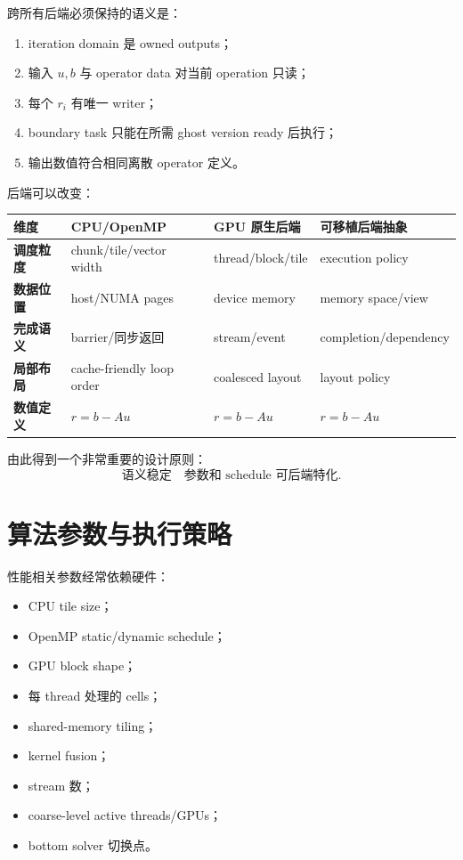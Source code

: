 跨所有后端必须保持的语义是：

\begin{enumerate}
\item iteration domain 是 owned outputs；
\item 输入 $u,b$ 与 operator data 对当前 operation 只读；
\item 每个 $r_i$ 有唯一 writer；
\item boundary task 只能在所需 ghost version ready 后执行；
\item 输出数值符合相同离散 operator 定义。
\end{enumerate}

后端可以改变：

\begin{center}
\begin{tabularx}{0.97\textwidth}{>{\bfseries}p{3.0cm}XXX}
\toprule
维度 & CPU/OpenMP & GPU 原生后端 & 可移植后端抽象\\
\midrule
调度粒度 & chunk/tile/vector width & thread/block/tile & execution policy\\
数据位置 & host/NUMA pages & device memory & memory space/view\\
完成语义 & barrier/同步返回 & stream/event & completion/dependency\\
局部布局 & cache-friendly loop order & coalesced layout & layout policy\\
数值定义 & $r=b-Au$ & $r=b-Au$ & $r=b-Au$\\
\bottomrule
\end{tabularx}
\end{center}

由此得到一个非常重要的设计原则：
\begin{equation}
\boxed{
\text{语义稳定}
\quad
\text{参数和 schedule 可后端特化}.
}
\label{eq:portability-semantics-policy}
\end{equation}

\section{算法参数与执行策略}

性能相关参数经常依赖硬件：

\begin{itemize}
\item CPU tile size；
\item OpenMP static/dynamic schedule；
\item GPU block shape；
\item 每 thread 处理的 cells；
\item shared-memory tiling；
\item kernel fusion；
\item stream 数；
\item coarse-level active threads/GPUs；
\item bottom solver 切换点。
\end{itemize}

